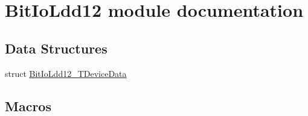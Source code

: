 \hypertarget{group___bit_io_ldd12__module}{}\section{Bit\+Io\+Ldd12 module documentation}
\label{group___bit_io_ldd12__module}
\subsection*{Data Structures}
\begin{DoxyCompactItemize}
\item 
struct \hyperlink{struct_bit_io_ldd12___t_device_data}{Bit\+Io\+Ldd12\+\_\+\+T\+Device\+Data}
\end{DoxyCompactItemize}
\subsection*{Macros}
